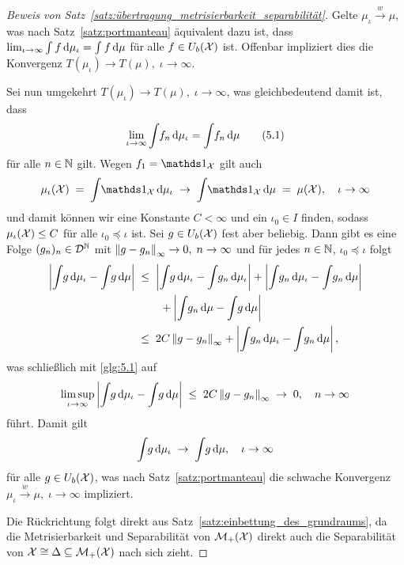 \documentclass[../main/main.tex]{subfiles}
\begin{document}
\begin{proof}[Beweis von Satz~\ref{satz:übertragung_metrisierbarkeit_separabilität}]
		Gelte $\mu_\iota \xrightarrow{w} \mu$, was nach Satz~\ref{satz:portmanteau} äquivalent dazu ist, dass $\lim_{\iota \to \infty} \int_{} \, f \, \mathrm{d}\mu_\iota = \int_{} \, f \, \mathrm{d}\mu$ für alle 
		$f \in U_b(\mathcal{X})$ ist. Offenbar impliziert dies die Konvergenz $T(\mu_\iota) \to T(\mu), \; \iota \to \infty$.
		
		Sei nun umgekehrt $T(\mu_\iota) \to T(\mu), \; \iota \to \infty$, was gleichbedeutend damit ist, dass 
		\[ \lim_{\iota \to \infty} \int_{} \, f_n \, \mathrm{d}\mu_\iota = \int_{} \, f_n \, \mathrm{d}\mu \label{glg:5.1} \tag{5.1} \] 
		für alle $n \in \mathbb{N}$ gilt.
		Wegen $f_1 = \indfct_\X$ gilt auch
		\[ \mu_\iota(\X) \; = \; \measureint{}{\indfct_\X}{\mu_\iota} \; \to \; \measureint{}{\indfct_\X}{\mu} \; = \; \mu(\X), \quad \iota \to \infty \]
		und damit können wir eine Konstante $C < \infty$ und ein $\iota_0 \in I$ finden, sodass $\mu_\iota(\mathcal{X}) \leq C$ für alle $\iota_0 \preceq \iota$ ist.
		Sei $g \in U_b(\mathcal{X})$ fest aber beliebig. Dann gibt es eine Folge $(g_n)_n \in \mathcal{D}^{\mathbb{N}}$ mit $\left\lVert g - g_n\right\rVert_\infty \to 0, \; n \to \infty$ und für jedes $n \in \mathbb{N}$, $\iota_0 \preceq \iota$ folgt
		\begin{align*}
			\left| \int_{} \, g \, \mathrm{d}\mu_\iota - \int_{} \, g \, \mathrm{d}\mu \right| \; &\leq \; 
			\left| \int_{} \, g \, \mathrm{d}\mu_\iota - \int_{} \, g_n \, \mathrm{d}\mu_\iota \right| + 
			\left| \int_{} \, g_n \, \mathrm{d}\mu_\iota - \int_{} \, g_n \, \mathrm{d}\mu \right| \\
			& \qquad + 
			\left| \int_{} \, g_n \, \mathrm{d}\mu - \int_{} \, g \, \mathrm{d}\mu \right| \\
			&\leq \; 2 C \left\lVert g - g_n\right\rVert_\infty + \left| \int_{} \, g_n \, \mathrm{d}\mu_\iota - 
			\int_{} \, g_n \, \mathrm{d}\mu \right| \text{,}
		\end{align*}
		was schließlich mit \eqref{glg:5.1} auf
		\[ \limsup_{\iota \to \infty} \left| \int_{} \, g \, \mathrm{d}\mu_\iota - \int_{} \, g \, \mathrm{d}\mu \right| \; \leq \; 2 C \left\lVert g - g_n\right\rVert_\infty \; \to \; 0, \quad n \to \infty \]
		führt. Damit gilt 
		\[ \int_{} \, g \, \mathrm{d}\mu_\iota \; \to \; \int_{} \, g \, \mathrm{d}\mu, \quad \iota \to \infty \]
		für alle $g \in U_b(\mathcal{X})$, was nach Satz~\ref{satz:portmanteau} die schwache Konvergenz $\mu_\iota \xrightarrow{w} \mu, \; \iota \to \infty$ impliziert.
		
		Die Rückrichtung folgt direkt aus Satz~\ref{satz:einbettung_des_grundraums}, da die Metrisierbarkeit und Separabilität von $\mathcal{M}_{+}(\mathcal{X})$ direkt auch die Separabilität von $\mathcal{X} \cong \Delta \subseteq \mathcal{M}_{+}(\mathcal{X})$ nach sich zieht.
	\end{proof}
\end{document}
